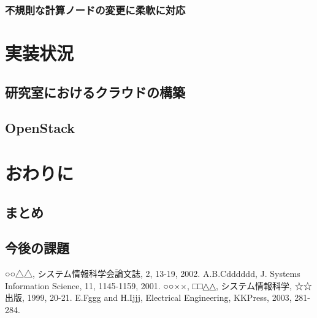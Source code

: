 \subsubsection{不規則な計算ノードの変更に柔軟に対応}

\section{実装状況}
\subsection{研究室におけるクラウドの構築}
\subsection{OpenStack}

\section{おわりに}
\subsection{まとめ}
\subsection{今後の課題}

\begin{thebibliography}{99}
	○○△△, システム情報科学会論文誌, 2, 13-19, 2002.
	A.B.Cdddddd, J. Systems Information Science, 11, 1145-1159, 2001.
	○○××, □□△△, システム情報科学, ☆☆出版, 1999, 20-21.
	E.Fggg and H.Ijjj, Electrical Engineering, KKPress, 2003, 281-284.
\end{thebibliography}

%
%

